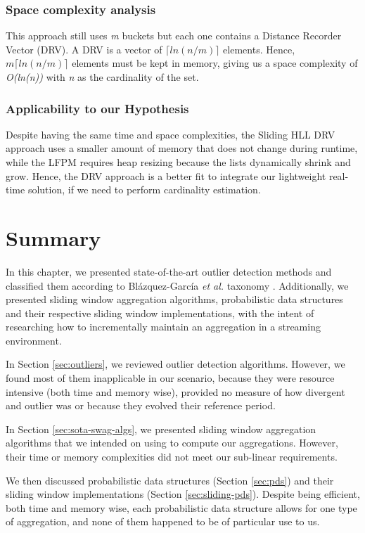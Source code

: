 \subsubsection*{Space complexity analysis}
This approach still uses \textit{m} buckets but each one contains a Distance Recorder Vector (DRV). A DRV is a vector of \textit{$\lceil ln(n/m) \rceil$} elements. Hence, \textit{$m \lceil ln(n/m) \rceil$} elements must be kept in memory, giving us a space complexity of \textit{O(ln(n))} with \textit{n} as the cardinality of the set.

\subsubsection*{Applicability to our Hypothesis}
Despite having the same time and space complexities, the Sliding HLL DRV approach uses a smaller amount of memory that does not change during runtime, while the LFPM requires heap resizing because the lists dynamically shrink and grow. Hence, the DRV approach is a better fit to integrate our lightweight real-time solution, if we need to perform cardinality estimation.


\section{Summary}

In this chapter, we presented state-of-the-art outlier detection methods and classified them according to Blázquez-García \emph{et al.} taxonomy \cite{Blazquez-Garcia-Review-Anomaly-Detection}. Additionally, we presented sliding window aggregation algorithms, probabilistic data structures and their respective sliding window implementations, with the intent of researching how to incrementally maintain an aggregation in a streaming environment.

In Section \ref{sec:outliers}, we reviewed outlier detection algorithms. However, we found most of them inapplicable in our scenario, because they were resource intensive (both time and memory wise), provided no measure of how divergent and outlier was or because they evolved their reference period.

In Section \ref{sec:sota-swag-algs}, we presented sliding window aggregation algorithms that we intended on using to compute our aggregations. However, their time or memory complexities did not meet our sub-linear requirements.

We then discussed probabilistic data structures (Section \ref{sec:pds}) and their sliding window implementations (Section \ref{sec:sliding-pds}). Despite being efficient, both time and memory wise, each probabilistic data structure allows for one type of aggregation, and none of them happened to be of particular use to us.
